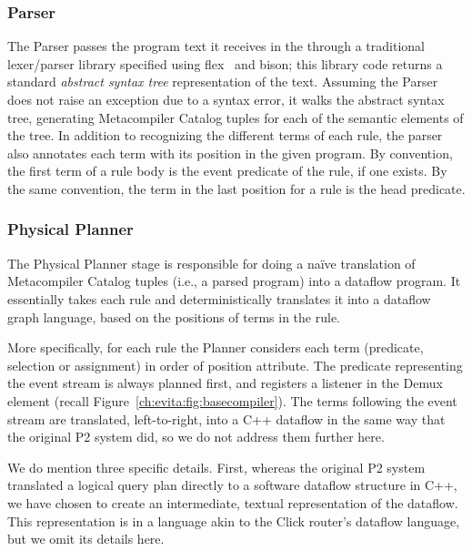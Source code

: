 \subsubsection{Parser}
\label{ch:evita:sec:parser}

The Parser passes the program text it receives in the 
through a traditional lexer/parser library specified using
flex~\cite{flexUrl} and bison\cite{bisonUrl}; this library code returns
a standard {\em abstract syntax tree} representation of the text.
Assuming the Parser does not raise an exception due to a syntax error,
it walks the abstract syntax tree, generating Metacompiler Catalog
tuples for each of the semantic elements of the tree. In addition to
recognizing the different terms of each rule, the parser also annotates
each term with its position in the given program.  By convention, the
first term of a rule body is the event predicate of the rule, if one
exists.  By the same convention, the term in the last position for a
rule is the head predicate.



\subsubsection{Physical Planner}
\label{ch:evita:sec:planner}

The Physical Planner stage is responsible for doing a na\"{i}ve translation of
Metacompiler Catalog tuples (i.e., a parsed \OVERLOG program) into a dataflow
program.  It essentially takes each rule and deterministically translates it
into a dataflow graph language, based on the positions of terms in the rule.

More specifically, for each rule the Planner considers each term (predicate,
selection or assignment) in order of position attribute.  The predicate
representing the event stream is always planned first, and registers a listener
in the Demux element (recall Figure~\ref{ch:evita:fig:basecompiler}).  The
terms following the event stream are translated, left-to-right, into a C++
dataflow in the same way that the original P2 system did, so we do not address
them further here.

We do mention three specific details.  First, whereas the original P2 system
translated a logical query plan directly to a software dataflow structure in
C++, we have chosen to create an intermediate, textual representation of the
dataflow.  This representation is in a language akin to the Click router's
dataflow language, but we omit its details here.

